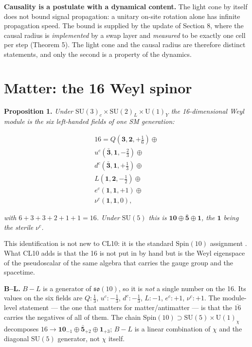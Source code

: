 \documentclass[aps,prd,twocolumn,amsmath,amssymb,superscriptaddress,nofootinbib,floatfix]{revtex4-2}
\begin{document}
\textbf{Causality is a postulate with a dynamical content.} The light
cone by itself does not bound signal propagation: a unitary on-site
rotation alone has infinite propagation speed. The bound is supplied by
the update of Section 8, where the causal radius is \emph{implemented}
by a swap layer and \emph{measured} to be exactly one cell per step
(Theorem 5). The light cone and the causal radius are therefore distinct
statements, and only the second is a property of the dynamics.

\section{Matter: the 16 Weyl spinor}\label{matter-the-16-weyl-spinor}

\textbf{Proposition 1.} \emph{Under
\(\mathrm{SU}(3)_c\times\mathrm{SU}(2)_L\times\mathrm{U}(1)_Y\) the
16-dimensional Weyl module is the six left-handed fields of one SM
generation:}

\begin{multline}
    16 = Q(\mathbf{3},\mathbf{2},+\tfrac16)\oplus \\
    u^c(\bar{\mathbf{3}},\mathbf{1},-\tfrac23)\oplus \\
    d^c(\bar{\mathbf{3}},\mathbf{1},+\tfrac13)\oplus \\
    L(\mathbf{1},\mathbf{2},-\tfrac12)\oplus \\
    e^c(\mathbf{1},\mathbf{1},+1)\oplus \\
    \nu^c(\mathbf{1},\mathbf{1},0),
\end{multline}

\emph{with \(6+3+3+2+1+1 = 16\). Under \(\mathrm{SU}(5)\) this is
\(\mathbf{10}\oplus\bar{\mathbf{5}}\oplus\mathbf{1}\), the
\(\mathbf{1}\) being the sterile \(\nu^c\).}

This identification is not new to CL10: it is the standard
\(\mathrm{Spin}(10)\) assignment \cite{ref06,ref07,ref08,ref09,ref12}.
What CL10 adds is that the 16 is not put in by hand but is the Weyl
eigenspace of the pseudoscalar of the same algebra that carries the
gauge group and the spacetime.

\textbf{B--L.} \(B-L\) is a generator of \(\mathfrak{so}(10)\), so it is
\emph{not} a single number on the 16. Its values on the six fields are
\(Q: \tfrac13\), \(u^c: -\tfrac13\), \(d^c: -\tfrac13\), \(L: -1\),
\(e^c: +1\), \(\nu^c: +1\). The module-level statement --- the one that
matters for matter/antimatter --- is that the \(\overline{16}\) carries
the negatives of all of them. The chain
\(\mathrm{Spin}(10) \supset \mathrm{SU}(5)\times \mathrm{U}(1)_\chi\)
decomposes
\(16 \to \mathbf{10}_{-1}\oplus\bar{\mathbf{5}}_{+2}\oplus\mathbf{1}_{+3}\);
\(B-L\) is a linear combination of \(\chi\) and the diagonal
\(\mathrm{SU}(5)\) generator, not \(\chi\) itself.
\end{document}
